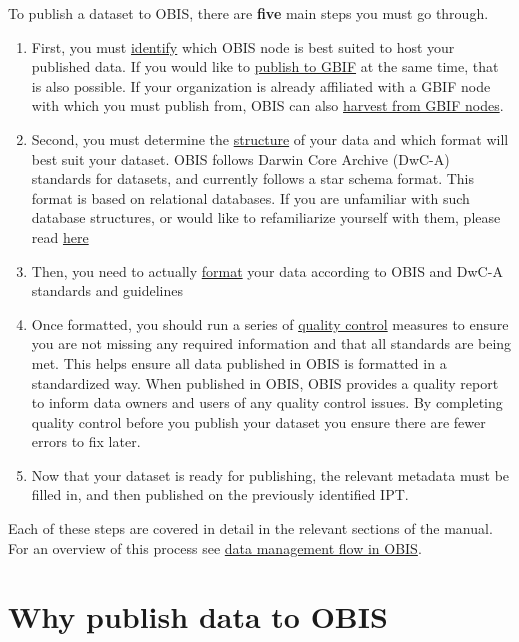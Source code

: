 \documentclass[
  letterpaper,
  DIV=11,
  numbers=noendperiod,
  oneside]{scrreprt}
\providecommand{\tightlist}{%
  \setlength{\itemsep}{0pt}\setlength{\parskip}{0pt}}\usepackage{longtable,booktabs,array}
\begin{document}
To publish a dataset to OBIS, there are \textbf{five} main steps you
must go through.

\begin{enumerate}
\def\labelenumi{\arabic{enumi}.}
\tightlist
\item
  First, you must \href{https://obis.org/contact/}{identify} which OBIS
  node is best suited to host your published data. If you would like to
  \protect\hyperlink{simultaneous-publishing-to-gbif}{publish to GBIF}
  at the same time, that is also possible. If your organization is
  already affiliated with a GBIF node with which you must publish from,
  OBIS can also
  \protect\hyperlink{simultaneous-publishing-to-gbif}{harvest from GBIF
  nodes}.
\item
  Second, you must determine the \href{formatting.html}{structure} of
  your data and which format will best suit your dataset. OBIS follows
  Darwin Core Archive (DwC-A) standards for datasets, and currently
  follows a star schema format. This format is based on relational
  databases. If you are unfamiliar with such database structures, or
  would like to refamiliarize yourself with them, please read
  \href{relational_db.html}{here}
\item
  Then, you need to actually \href{formatting.html}{format} your data
  according to OBIS and DwC-A standards and guidelines
\item
  Once formatted, you should run a series of \href{data_qc.html}{quality
  control} measures to ensure you are not missing any required
  information and that all standards are being met. This helps ensure
  all data published in OBIS is formatted in a standardized way. When
  published in OBIS, OBIS provides a quality report to inform data
  owners and users of any quality control issues. By completing quality
  control before you publish your dataset you ensure there are fewer
  errors to fix later.
\item
  Now that your dataset is ready for publishing, the relevant metadata
  must be filled in, and then published on the previously identified
  IPT.
\end{enumerate}

Each of these steps are covered in detail in the relevant sections of
the manual. For an overview of this process see
\href{data_standards.html}{data management flow in OBIS}.

\hypertarget{why-publish-data-to-obis}{%
\section{Why publish data to OBIS}\label{why-publish-data-to-obis}}
\end{document}
